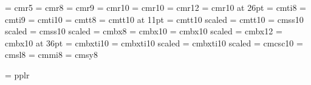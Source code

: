 

% 
% 

%
\font\fiverm = cmr5
\font\eightrm = cmr8
\font\ninerm = cmr9 %
\font\tenrm = cmr10 %
\font\oldtenrm = cmr10 %
\font\twelverm = cmr12
\font\twentysixrm = cmr10 at 26pt
%
\font\eightit = cmti8
\font\nineit = cmti9
\font\tenit = cmti10
%
\font\eighttt = cmtt8
\font\eleventt = cmtt10 at 11pt
\font\twelvett = cmtt10 scaled 
%
\font\tenbt = cmtt10
%
\font\elevensf = cmss10 scaled\magstephalf
\font\fourteensf = cmss10 scaled
%
\font\eightbf = cmbx8
\font\tenbf = cmbx10
\font\elevenbf = cmbx10 scaled \magstephalf
\font\twelvebf = cmbx12
\font\thirtysixbf = cmbx10 at 36pt
%
\font\tenbi = cmbxti10
\font\elevenbi= cmbxti10 scaled \magstephalf
\font\fourteenbi= cmbxti10 scaled 
%
\font\tensc = cmcsc10
\font\eightsl = cmsl8
\font\eighti = cmmi8
\font\eightsy = cmsy8

 
%
\font\tenpal = pplr

